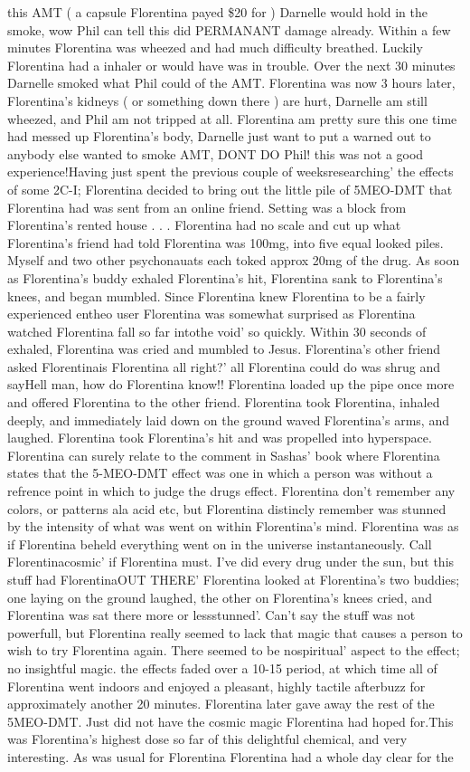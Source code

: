 \documentclass[12pt]{book}
\begin{document}
this AMT ( a capsule Florentina payed \$20 for ) Darnelle would hold in the smoke, wow Phil can tell this did PERMANANT damage already. Within a few minutes Florentina was wheezed and had much difficulty breathed. Luckily Florentina had a inhaler or would have was in trouble. Over the next 30 minutes Darnelle smoked what Phil could of the AMT. Florentina was now 3 hours later, Florentina's kidneys ( or something down there ) are hurt, Darnelle am still wheezed, and Phil am not tripped at all. Florentina am pretty sure this one time had messed up Florentina's body, Darnelle just want to put a warned out to anybody else wanted to smoke AMT, DONT DO Phil! this was not a good experience!Having just spent the previous couple of weeksresearching' the effects of some 2C-I; Florentina decided to bring out the little pile of 5MEO-DMT that Florentina had was sent from an online friend. Setting was a block from Florentina's rented house . . .  Florentina had no scale and cut up what Florentina's friend had told Florentina was 100mg, into five equal looked piles. Myself and two other psychonauats each toked approx 20mg of the drug. As soon as Florentina's buddy exhaled Florentina's hit, Florentina sank to Florentina's knees, and began mumbled. Since Florentina knew Florentina to be a fairly experienced entheo user Florentina was somewhat surprised as Florentina watched Florentina fall so far intothe void' so quickly. Within 30 seconds of exhaled, Florentina was cried and mumbled to Jesus. Florentina's other friend asked Florentinais Florentina all right?' all Florentina could do was shrug and sayHell man, how do Florentina know!! Florentina loaded up the pipe once more and offered Florentina to the other friend. Florentina took Florentina, inhaled deeply, and immediately laid down on the ground waved Florentina's arms, and laughed. Florentina took Florentina's hit and was propelled into hyperspace. Florentina can surely relate to the comment in Sashas' book where Florentina states that the 5-MEO-DMT effect was one in which a person was without a refrence point in which to judge the drugs effect. Florentina don't remember any colors, or patterns ala acid etc, but Florentina distincly remember was stunned by the intensity of what was went on within Florentina's mind. Florentina was as if Florentina beheld everything went on in the universe instantaneously. Call Florentinacosmic' if Florentina must. I've did every drug under the sun, but this stuff had FlorentinaOUT THERE' Florentina looked at Florentina's two buddies; one laying on the ground laughed, the other on Florentina's knees cried, and Florentina was sat there more or lessstunned'. Can't say the stuff was not powerfull, but Florentina really seemed to lack that magic that causes a person to wish to try Florentina again. There seemed to be nospiritual' aspect to the effect; no insightful magic. the effects faded over a 10-15 period, at which time all of Florentina went indoors and enjoyed a pleasant, highly tactile afterbuzz for approximately another 20 minutes. Florentina later gave away the rest of the 5MEO-DMT. Just did not have the cosmic magic Florentina had hoped for.This was Florentina's highest dose so far of this delightful chemical, and very interesting. As was usual for Florentina Florentina had a whole day clear for the 
\end{document}
